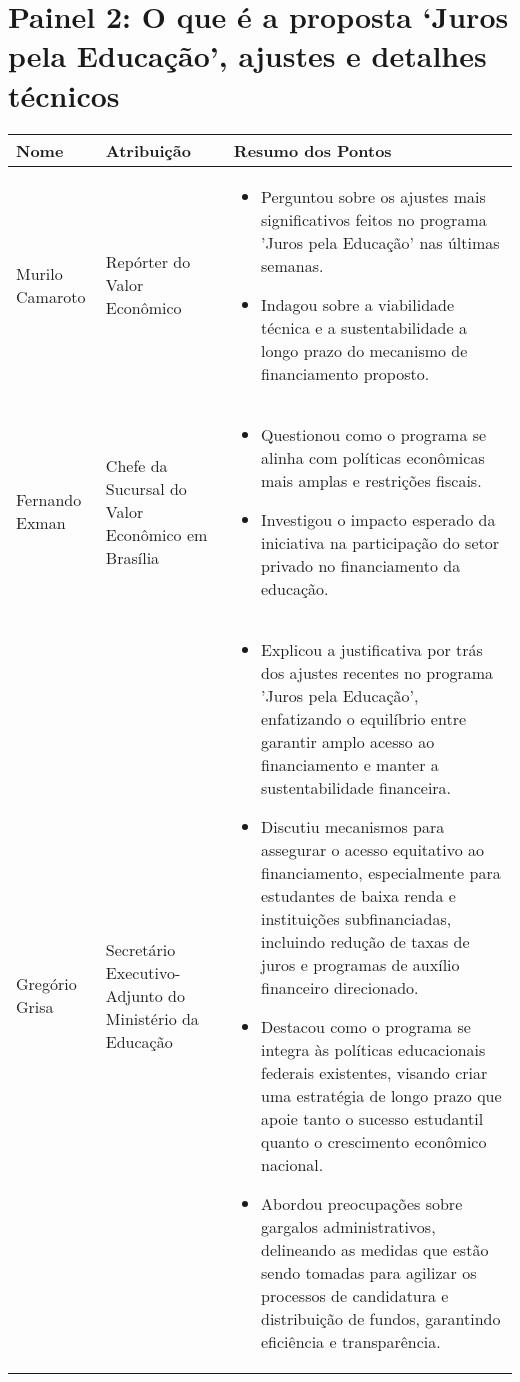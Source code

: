 \documentclass[a4paper,10pt]{article}
\begin{document}
\section*{Painel 2: O que é a proposta `Juros pela Educação', ajustes e detalhes técnicos}
\begin{table}[htbp!]
	\centering
	\renewcommand{\arraystretch}{1.2}
	\begin{tabular}{|p{1in}|p{1.4in}|p{4.2in}|}
		\hline
		Nome & Atribuição & Resumo dos Pontos \\
		\hline
		Murilo Camaroto & Repórter do Valor Econômico & \begin{itemize}
			\item Perguntou sobre os ajustes mais significativos feitos no programa 'Juros pela Educação' nas últimas semanas.
			\item Indagou sobre a viabilidade técnica e a sustentabilidade a longo prazo do mecanismo de financiamento proposto.
		\end{itemize}\\
		\hline
		Fernando Exman & Chefe da Sucursal do Valor Econômico em Brasília & \begin{itemize}
			\item Questionou como o programa se alinha com políticas econômicas mais amplas e restrições fiscais.
			\item Investigou o impacto esperado da iniciativa na participação do setor privado no financiamento da educação.
		\end{itemize}\\
		\hline
		Gregório Grisa & Secretário Executivo-Adjunto do Ministério da Educação & \begin{itemize}
			\item Explicou a justificativa por trás dos ajustes recentes no programa 'Juros pela Educação', enfatizando o equilíbrio entre garantir amplo acesso ao financiamento e manter a sustentabilidade financeira.
			\item Discutiu mecanismos para assegurar o acesso equitativo ao financiamento, especialmente para estudantes de baixa renda e instituições subfinanciadas, incluindo redução de taxas de juros e programas de auxílio financeiro direcionado.
			\item Destacou como o programa se integra às políticas educacionais federais existentes, visando criar uma estratégia de longo prazo que apoie tanto o sucesso estudantil quanto o crescimento econômico nacional.
			\item Abordou preocupações sobre gargalos administrativos, delineando as medidas que estão sendo tomadas para agilizar os processos de candidatura e distribuição de fundos, garantindo eficiência e transparência.

\end{itemize}
\end{tabular}
\end{table}
\end{document}
